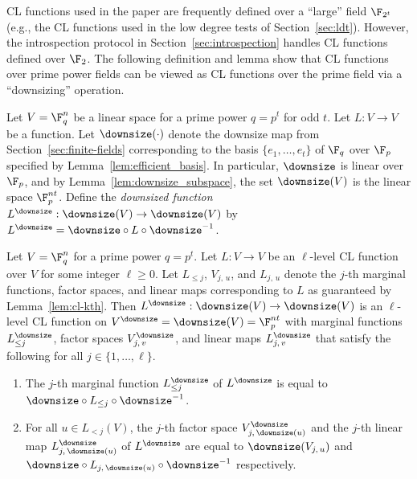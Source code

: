 CL functions used in the paper are frequently defined over a ``large'' field
$\F_{2^t}$ (e.g., the CL functions used in the low degree tests of
Section~\ref{sec:ldt}).
However, the introspection protocol in Section~\ref{sec:introspection} handles
CL functions defined over $\F_2$.
The following definition and lemma show that CL functions over prime power
fields can be viewed as CL functions over the prime field via a ``downsizing''
operation.

\begin{definition}
  \label{def:cl-downsize}
  Let $V = \F_{q}^n$ be a linear space for a prime power $q=p^t$ for odd $t$.
  Let $L: V \to V$ be a function.
  Let $\downsize(\cdot)$ denote the downsize map from
  Section~\ref{sec:finite-fields} corresponding to the basis
  $\{e_1,\ldots,e_t\}$ of $\F_q$ over $\F_p$ specified by
  Lemma~\ref{lem:efficient_basis}.
  In particular, $\downsize$ is linear over $\F_p$, and by
  Lemma~\ref{lem:downsize_subspace}, the set $\downsize(V)$ is the linear space
  $\F_p^{nt}$.
  Define the \emph{downsized function} $L^\downsize : \downsize(V) \to
  \downsize(V)$ by $L^\downsize = \downsize \circ L \circ \downsize^{-1}$.
\end{definition}

\begin{lemma}
  \label{lem:cl-downsize}
	Let $V = \F_q^n$ for a prime power $q = p^t$.
  Let $L: V \to V$ be an $\ell$-level CL function over $V$ for some integer
  $\ell \ge 0$.
  Let $L_{\leq j}$, $V_{j,\, u}$, and $L_{j,\, u}$ denote the $j$-th marginal
  functions, factor spaces, and linear maps corresponding to $L$ as guaranteed
  by Lemma~\ref{lem:cl-kth}.
  Then $L^\downsize: \downsize(V) \to \downsize(V)$ is an $\ell$-level CL
  function on $V^\downsize = \downsize(V) = \F_p^{nt}$ with marginal functions
  $L^\downsize_{\leq j}$, factor spaces $V^\downsize_{j,\, v}$, and linear maps
  $L^\downsize_{j,\, v}$ that satisfy the following for all
  $j\in\{1,\ldots,\ell\}$.
  \begin{enumerate}
  \item The $j$-th marginal function $L^\downsize_{\leq j}$ of $L^\downsize$ is
    equal to $\downsize \circ L_{\leq j} \circ \downsize^{-1}$.
	\item For all $u \in L_{< j} (V)$, the $j$-th factor space $V_{j,\,
      \downsize(u)}^\downsize$ and the $j$-th linear map $L_{j,\,
      \downsize(u)}^\downsize$ of $L^\downsize$ are equal to $\downsize(V_{j,\,
      u})$ and $\downsize \circ L_{j,\, \downsize(u)} \circ \downsize^{-1}$ respectively.
  \end{enumerate}
\end{lemma}


